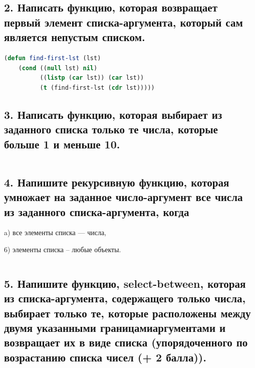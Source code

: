 \documentclass[12pt]{report}
\begin{document}
\subsection*{2. Написать функцию, которая возвращает первый элемент списка-аргумента, который сам
	является непустым списком.}

\begin{lstlisting}[label=6xd, caption=Решение задания №2, language=lisp]
(defun find-first-lst (lst) 
	(cond ((null lst) nil)
		  ((listp (car lst)) (car lst)) 
		  (t (find-first-lst (cdr lst)))))

\end{lstlisting}

\subsection*{3. Написать функцию, которая выбирает из заданного списка только те числа, которые
	больше 1 и меньше 10.}

\begin{lstlisting}[label=6xd, caption=Решение задания №3, language=lisp]


\end{lstlisting}

\subsection*{4. Напишите рекурсивную функцию, которая умножает на заданное число-аргумент все
	числа
	из заданного списка-аргумента, когда}

a) все элементы списка --- числа,

6) элементы списка -- любые объекты.

\begin{lstlisting}[label=6xd, caption=Решение задания №4, language=lisp]


\end{lstlisting}

\subsection*{5. Напишите функцию, select-between, которая из списка-аргумента, содержащего только
	числа, выбирает только те, которые расположены между двумя указанными границамиаргументами и возвращает их в виде списка (упорядоченного по возрастанию списка чисел
	(+ 2 балла)).}

\begin{lstlisting}[label=6xd, caption=Решение задания №5, language=lisp]

	
\end{lstlisting}
\end{document}
